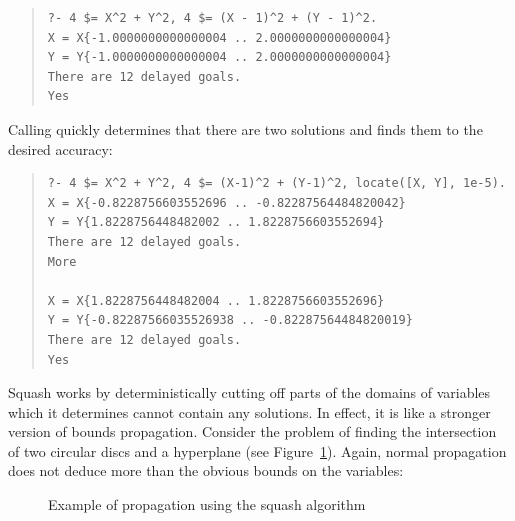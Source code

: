 \begin{quote}\begin{verbatim}
?- 4 $= X^2 + Y^2, 4 $= (X - 1)^2 + (Y - 1)^2.
X = X{-1.0000000000000004 .. 2.0000000000000004}
Y = Y{-1.0000000000000004 .. 2.0000000000000004}
There are 12 delayed goals.
Yes
\end{verbatim}\end{quote}

Calling  quickly determines
that there are two solutions and finds them to the desired accuracy:

\begin{quote}\begin{verbatim}
?- 4 $= X^2 + Y^2, 4 $= (X-1)^2 + (Y-1)^2, locate([X, Y], 1e-5).
X = X{-0.8228756603552696 .. -0.82287564484820042}
Y = Y{1.8228756448482002 .. 1.8228756603552694}
There are 12 delayed goals.
More

X = X{1.8228756448482004 .. 1.8228756603552696}
Y = Y{-0.82287566035526938 .. -0.82287564484820019}
There are 12 delayed goals.
Yes
\end{verbatim}\end{quote}

Squash works by deterministically cutting off parts of the domains of
variables which it determines cannot contain any solutions.  In effect, it
is like a stronger version of bounds propagation.  Consider the problem of
finding the intersection of two circular discs and a hyperplane (see
Figure~\ref{squashfig}).  Again, normal propagation does not deduce more
than the obvious bounds on the variables:

\begin{figure}
\begin{center}
\end{center}
\caption{Example of propagation using the squash algorithm}
\label{squashfig}
\end{figure}

